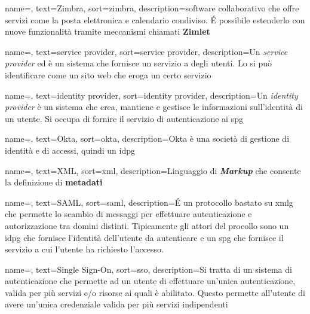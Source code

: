 
{
    name=,
    text=Zimbra,
    sort=zimbra,
    description={software collaborativo che offre servizi come la posta elettronica e calendario condiviso. \'E possibile estenderlo con nuove funzionalità tramite meccanismi chiamati \textbf{Zimlet}}
}

{
    name=,
    text=service provider,
    sort=service provider,
    description={Un \textit{service provider} ed è un sistema che fornisce un servizio a degli utenti. Lo si può identificare come un sito web che eroga un certo servizio}
}

{
    name=,
    text=identity provider,
    sort=identity provider,
    description={Un \textit{identity provider} è un sistema che crea, mantiene e gestisce le informazioni sull'identità di un utente. Si occupa di fornire il servizio di autenticazione ai \gls{spg}}
}

{
    name=,
    text=Okta,
    sort=okta,
    description={Okta è una società di gestione di identità e di accessi, quindi un \gls{idpg}}
}

{
    name=,
    text=XML,
    sort=xml,
    description={Linguaggio di \textit{\textbf{Markup}} che consente la definizione di \textbf{metadati}}
}

{
    name=,
    text=SAML,
    sort=saml,
    description={\'E un protocollo bastato su \gls{xmlg} che permette lo scambio di messaggi per effettuare autenticazione e autorizzazione tra domini distinti. Tipicamente gli attori del procollo sono un \gls{idpg} che fornisce l'identità dell'utente da autenticare e un \gls{spg} che fornisce il servizio a cui l'utente ha richiesto l'accesso. }
}

{
    name=,
    text=Single Sign-On,
    sort=sso,
    description={Si tratta di un sistema di autenticazione che permette ad un utente di effettuare un'unica autenticazione, valida per più servizi e/o risorse ai quali è abilitato. Questo permette all'utente di avere un'unica credenziale valida per più servizi indipendenti}
}

